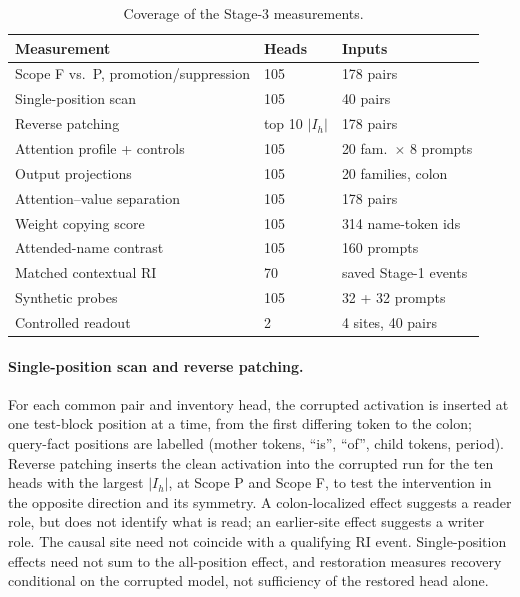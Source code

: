 \begin{table}[h]
\centering\scriptsize
\setlength{\tabcolsep}{3pt}
\begin{tabular}{@{}lll@{}}
\toprule
Measurement & Heads & Inputs \\
\midrule
Scope F vs.\ P, promotion/suppression & 105 & 178 pairs \\
Single-position scan & 105 & 40 pairs \\
Reverse patching & top 10 $|I_h|$ & 178 pairs \\
Attention profile + controls & 105 & 20 fam.\ $\times$ 8 prompts \\
Output projections & 105 & 20 families, colon \\
Attention--value separation & 105 & 178 pairs \\
Weight copying score & 105 & 314 name-token ids \\
Attended-name contrast & 105 & 160 prompts \\
Matched contextual RI & 70 & saved Stage-1 events \\
Synthetic probes & 105 & 32 + 32 prompts \\
Controlled readout & 2 & 4 sites, 40 pairs \\
\bottomrule
\end{tabular}
\caption{Coverage of the Stage-3 measurements.}
\label{tab:stage3cov}
\end{table}

\paragraph{Single-position scan and reverse patching.}
For each common pair and inventory head, the corrupted activation is inserted at
one test-block position at a time, from the first differing token to the colon;
query-fact positions are labelled (mother tokens, ``is'', ``of'', child tokens,
period). Reverse patching inserts the clean activation into the corrupted run for
the ten heads with the largest $|I_h|$, at Scope P and Scope F, to test the
intervention in the opposite direction and its symmetry. A colon-localized effect
suggests a reader role, but does not identify what is read; an earlier-site effect
suggests a writer role. The causal site need not coincide with a qualifying RI
event. Single-position effects need not sum to the all-position effect, and
restoration measures recovery conditional on the corrupted model, not sufficiency
of the restored head alone.

